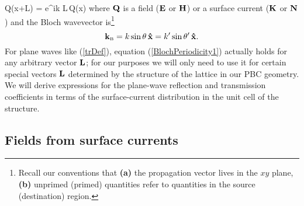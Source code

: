 \documentclass[letterpaper]{article}
\begin{document}
{\vb Q(\vb x+\vb L) = e^{i\vb k \cdot \vb L}\,\vb Q(\vb x)}
where $\mathbf{Q}$ is a field ($\mathbf{E}$ or $\mathbf{H}$) or a surface current
($\mathbf{K}$ or $\mathbf{N}$) and the Bloch wavevector is\footnote{Recall
our conventions that \textbf{(a)} the propagation vector lives
in the $xy$ plane, \textbf{(b)} unprimed (primed) quantities 
refer to quantities in the source (destination) region.}
$$\mathbf{k}_{\hbox{\tiny{B}}}=k\sin\theta \, \mathbf{\hat x}
               =k^\prime \sin\theta^\prime \, \mathbf{\hat x}.
$$
For plane waves like (\ref{trDef}), equation (\ref{BlochPeriodicity1})
actually holds for any arbitrary vector $\mathbf{L}$; for our
purposes we will only need to use it for certain special
vectors $\mathbf{L}$ determined by the structure of the lattice in
our PBC geometry.
We will derive expressions for the
plane-wave reflection and transmission coefficients in terms
of the surface-current distribution in the unit cell of the structure.


\subsection*{Fields from surface currents}
\end{document}
